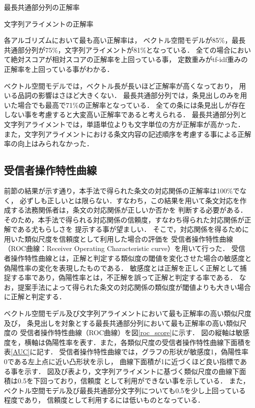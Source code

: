 \documentclass[japanese]{jnlp_1.4}
\begin{document}
\begin{table}[t]
\caption{最長共通部分列の正解率}\label{res:LCS}

\end{table}
\begin{table}[t]
\caption{文字列アライメントの正解率}
\label{res:alignment}

\end{table}

各アルゴリズムにおいて最も高い正解率は，
ベクトル空間モデルが85\%，最長共通部分列が75\%，文字列アライメントが81\%となっている．
全ての場合において絶対スコアが相対スコアの正解率を上回っている事，
定数重みがtf-idf重みの正解率を上回っている事がわかる．

ベクトル空間モデルでは，ベクトル長が長いほど正解率が高くなっており，
用いる品詞の影響はさほど大きくない．
最長共通部分列では，条見出しのみを用いた場合でも最高で71\%の正解率となっている．
全ての条には条見出しが存在しない事を考慮すると大変高い正解率であると考えられる．
最長共通部分列と文字列アライメントでは，単語単位よりも文字単位の方が正解率が高かった．
また，文字列アライメントにおける条文内容の記述順序を考慮する事による正解率の向上はみられなかった．





\subsection{受信者操作特性曲線}
\label{sec:roc}

前節の結果が示す通り，本手法で得られた条文の対応関係の正解率は100\%でなく，
必ずしも正しいとは限らない．すなわち，この結果を用いて条文対応を作成する法務関係者は，条文の対応関係が正しいか否かを
判断する必要がある．
そのため，本手法で得られる対応関係の信頼度，すなわち得られた対応関係が正解である尤もらしさを
提示する事が望ましい．
そこで，対応関係を得るために用いた類似尺度を信頼度として利用した場合の評価を
受信者操作特性曲線（ROC曲線：Receiver Operating Characteristic curve）を用いて行った．
受信者操作特性曲線とは，正解と判定する類似度の閾値を変化させた場合の敏感度と偽陽性率の変化を表現したものである．
敏感度とは正解を正しく正解として捕捉する率であり，偽陽性率とは，不正解を誤って正解と判定する率である．
なお，提案手法によって得られた条文の対応関係の類似度が閾値よりも大きい場合に正解と判定する．

ベクトル空間モデル及び文字列アライメントにおいて最も正解率の高い類似尺度及び，
条見出しを対象とする最長共通部分列において最も正解率の高い類似尺度の
受信者操作特性曲線（ROC曲線）を図\ref{roc_score}に示す．
図の縦軸は敏感度を，横軸は偽陽性率を表す．また，各類似尺度の受信者操作特性曲線下面積を表\ref{AUC}に記す．
受信者操作特性曲線では，グラフの形状が敏感度1，偽陽性率0である左上点に近い凸形状を示し，
曲線下面積が1に近づくほど良い指標である事を示す．
図及び表より，文字列アライメントに基づく類似尺度の曲線下面積は0.5を下回っており，信頼度
として利用ができない事を示している．
また，ベクトル空間モデル及び最長共通部分文字列についても0.5を少し上回っている程度であり，
信頼度として利用するには低いものとなっている．
\end{document}
